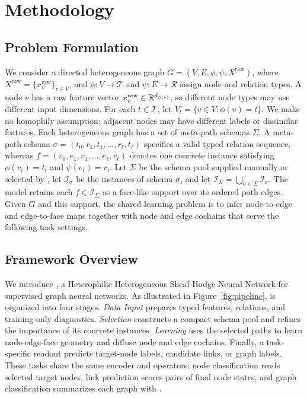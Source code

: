 \section{Methodology}
\label{sec:method}

\subsection{Problem Formulation}
We consider a directed heterogeneous graph
\(G=(V,E,\phi,\psi,X^{\mathrm{raw}})\), where
\(X^{\mathrm{raw}}=\{x_v^{\mathrm{raw}}\}_{v\in V}\), and
\(\phi:V\rightarrow\mathcal{T}\) and \(\psi:E\rightarrow\mathcal{R}\) assign node and relation
types. A node \(v\) has a raw feature vector
\(x_v^{\mathrm{raw}}\in\mathbb{R}^{d_{\phi(v)}}\), so different node types may use different input dimensions. For
each $t\in\mathcal{T}$, let $V_t=\{v\in V:\phi(v)=t\}$. We make no homophily assumption:
adjacent nodes may have different labels or dissimilar features. Each heterogeneous graph has a set of meta-path schemas $\Sigma$.
A meta-path schema
$\sigma=(t_0,r_1,t_1,\ldots,r_\ell,t_\ell)$ specifies a valid typed relation sequence, whereas
$f=(v_0,e_1,v_1,\ldots,e_\ell,v_\ell)$ denotes one concrete instance satisfying
$\phi(v_i)=t_i$ and $\psi(e_i)=r_i$. Let $\Sigma$ be the schema pool supplied manually or selected
by \ampss{}, let $\mathcal{I}_\sigma$ be the instances of schema $\sigma$, and let
$\mathcal{I}_\Sigma=\bigcup_{\sigma\in\Sigma}\mathcal{I}_\sigma$. The model retains each
$f\in\mathcal{I}_\Sigma$ as a face-like support over its ordered path edges. Given $G$ and this
support, the shared learning problem is to infer node-to-edge and edge-to-face maps together with
node and edge cochains that serve the following task settings.

\subsection{Framework Overview}

We introduce \method{}, a Heterophilic Heterogeneous Sheaf-Hodge Neural Network for supervised graph neural networks. As illustrated in Figure~\ref{fig:pipeline}, \method{} is organized into four stages.  \emph{Data Input} prepares typed
features, relations, and training-only diagnostics.  \emph{\ampss{} Selection} constructs a compact schema pool and refines the
importance of its concrete instances.  \emph{\method{} Learning} uses the selected paths to learn
node-edge-face geometry and diffuse node and edge cochains.  Finally, a task-specific readout
predicts target-node labels, candidate links, or graph labels.  These tasks share the same encoder
and operators: node classification reads selected target nodes, link prediction scores pairs of
final node states, and graph classification summarizes each graph with \sheafconvpool{}.

